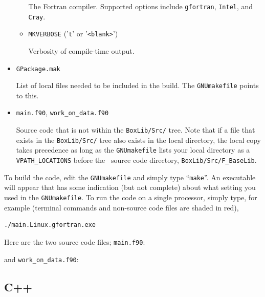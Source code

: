 \begin{itemize}
\begin{itemize}
    The Fortran compiler.  Supported options include {\tt gfortran}, {\tt Intel}, 
    and {\tt Cray}.

    \item {\tt MKVERBOSE} ('{\tt t}' or '{\tt <blank>}')

    Verbosity of compile-time output.

  \end{itemize}

\item {\tt GPackage.mak}

List of local files needed to be included in the build.  The {\tt GNUmakefile} points to this.

\item {\tt main.f90}, {\tt work\_on\_data.f90}

Source code that is not within the {\tt BoxLib/Src/} tree.  Note that 
if a file that exists in the
{\tt BoxLib/Src/} tree also exists in the local directory, the local copy takes precedence
as long as the {\tt GNUmakefile} lists your local directory as a {\tt VPATH\_LOCATIONS} 
before the \BoxLib\ source code directory, {\tt BoxLib/Src/F\_BaseLib}.

\end{itemize}

To build the code, edit the {\tt GNUmakefile} and simply type ``{\tt make}''.  An 
executable will appear that has some indication (but not complete)
about what setting you used in the {\tt GNUmakefile}.  To run the code on a single processor,
simply type, for example (terminal commands and non-source code files are shaded in red),
\begin{lstlisting}[backgroundcolor=\color{light-red}]
./main.Linux.gfortran.exe
\end{lstlisting}

Here are the two source code files; {\tt main.f90}:

and {\tt work\_on\_data.f90}:


\subsection{C++}

